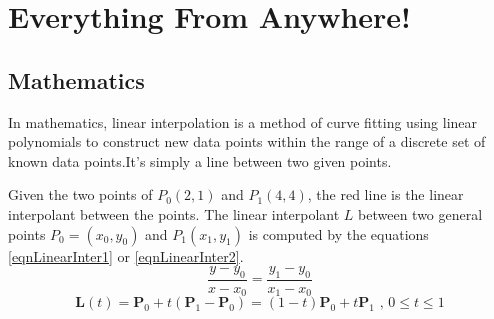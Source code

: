 \chapter{Everything From Anywhere!}
\section{Mathematics}
\begin{note}

In mathematics, linear interpolation is a method of curve fitting using linear polynomials to construct new data points within the range of a discrete set of known data points.It's simply a line between two given points.
\begin{center}
\end{center}
Given the two points of $P_0 (2,1)$ and $P_1 (4,4)$, the red line is the linear interpolant between the points. The linear interpolant  $L$ between two general points $P_0 = (x_0,y_0)$ and $P_1 (x_1,y_1)$ is computed by the equations \ref{eqnLinearInter1} or \ref{eqnLinearInter2}.
\begin{equation} \label{eqnLinearInter1}
\frac{y-y_0}{x-x_0} = \frac{y_1-y_0}{x_1-x_0} 
\end{equation}
\begin{equation} \label{eqnLinearInter2}
\mathbf {L} (t)=\mathbf {P} _{0}+t(\mathbf {P} _{1}-\mathbf {P} _{0})=(1-t)\mathbf {P} _{0}+t\mathbf {P} _{1}{\mbox{ , }}0\leq t\leq 1
\end{equation}
\end{note}

